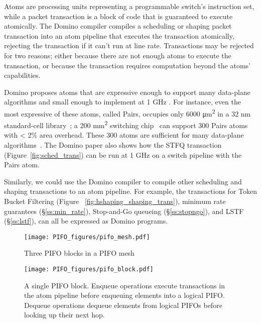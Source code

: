 Atoms are processing units representing a programmable switch's instruction
set, while a packet transaction is a block of code that is guaranteed to
execute atomically.  The Domino compiler compiles a scheduling or shaping packet
transaction into an atom pipeline that executes the transaction
atomically, rejecting the transaction if it can't run at line rate.
Transactions may be rejected for two reasons; either because there are
not enough atoms to execute the transaction, or because the
transaction requires computation beyond the atoms' capabilities.
 
Domino proposes atoms that are expressive enough to support many
data-plane algorithms and small enough to implement at 1 GHz . For
instance, even the most expressive of these atoms, called Pairs,
occupies only 6000 \si{\micro\metre\squared} in a 32 nm standard-cell
library~\cite{domino_sigcomm}; a 200 \si{\milli\metre\squared}
switching chip~\cite{glen_parsing} can support 300 Pairs atoms with
< 2\% area overhead. These 300 atoms are sufficient for
many data-plane algorithms~\cite{domino_sigcomm}. The Domino paper
also shows how the STFQ transaction (Figure~\ref{fig:sched_trans}) can
be run at 1 GHz on a switch pipeline with the Pairs atom.

Similarly, we could use the Domino compiler to compile other
scheduling and shaping transactions to an atom pipeline.  For example,
the transactions for Token Bucket Filtering (Figure
~\ref{fig:hshaping_shaping_trans}), minimum rate guarantees
(\S\ref{ss:min_rate}), Stop-and-Go queueing
(\S\ref{ss:stopngo}), and LSTF (\S\ref{ss:lstf}), can all
be expressed as Domino programs.  

\begin{figure}[!t]
  \centering
  \texttt{[image: PIFO\_figures/pifo\_mesh.pdf]}
  \caption{Three PIFO blocks in a PIFO mesh}
  \label{fig:mesh}
\end{figure}

\begin{figure}[!t]
  \centering
  \texttt{[image: PIFO\_figures/pifo\_block.pdf]}
  \caption{A single PIFO block. Enqueue operations execute transactions in the atom pipeline
  before enqueuing elements into a logical PIFO. Dequeue operations dequeue elements from logical PIFOs
  before looking up their next hop.} 
  \label{fig:block}
\end{figure}

